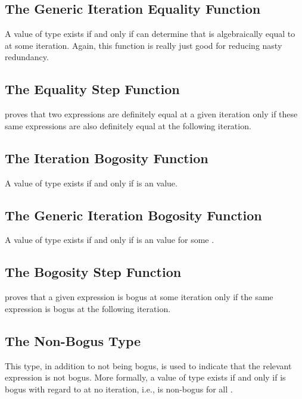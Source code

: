 \documentclass{report}
\begin{document}
\subsection{The Generic Iteration Equality Function}
A value of type     exists if and only if   can determine that  is algebraically equal to  at some iteration.  Again, this function is really just good for reducing nasty redundancy.

\subsection{The Equality Step Function}
 proves that two expressions are definitely equal at a given iteration only if these same expressions are also definitely equal at the following iteration.

\subsection{The Iteration Bogosity Function}
A value of type     exists if and only if     is an  value.

\subsection{The Generic Iteration Bogosity Function}
A value of type    exists if and only if     is an  value for some .

\subsection{The Bogosity Step Function}
 proves that a given expression is bogus at some iteration only if the same expression is bogus at the following iteration.

\subsection{The Non-Bogus Type}
This type, in addition to not being bogus, is used to indicate that the relevant expression is not bogus.  More formally, a value of type    exists if and only if  is bogus with regard to   at no iteration, i.e.,     is non-bogus for all .
\end{document}
